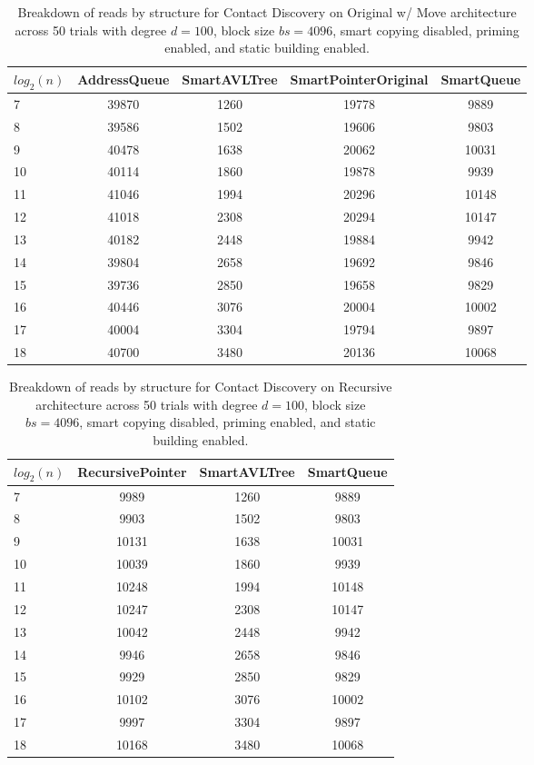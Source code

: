 \begin{table}[]
\centering
\begin{tabular}{|l|c|c|c|c|}
$log_2(n)$ & AddressQueue & SmartAVLTree & SmartPointerOriginal & SmartQueue \\ \hline
7 & 39870 & 1260 & 19778 & 9889 \\ \hline
8 & 39586 & 1502 & 19606 & 9803 \\ \hline
9 & 40478 & 1638 & 20062 & 10031 \\ \hline
10 & 40114 & 1860 & 19878 & 9939 \\ \hline
11 & 41046 & 1994 & 20296 & 10148 \\ \hline
12 & 41018 & 2308 & 20294 & 10147 \\ \hline
13 & 40182 & 2448 & 19884 & 9942 \\ \hline
14 & 39804 & 2658 & 19692 & 9846 \\ \hline
15 & 39736 & 2850 & 19658 & 9829 \\ \hline
16 & 40446 & 3076 & 20004 & 10002 \\ \hline
17 & 40004 & 3304 & 19794 & 9897 \\ \hline
18 & 40700 & 3480 & 20136 & 10068 \\ \hline
\end{tabular}
\caption{Breakdown of reads by structure for Contact Discovery on Original w/ Move architecture across 50 trials with degree $d=100$, block size $bs=4096$, smart copying disabled, priming enabled, and static building enabled.}
    \label{tab:reads_by_structure_cd_d100_bs4096_trials50_copiesfalse_primetrue_staticinsertiontrue_ptoriginal_movetrue}
\end{table}

\begin{table}[]
\centering
\begin{tabular}{|l|c|c|c|}
$log_2(n)$ & RecursivePointer & SmartAVLTree & SmartQueue \\ \hline
7 & 9989 & 1260 & 9889 \\ \hline
8 & 9903 & 1502 & 9803 \\ \hline
9 & 10131 & 1638 & 10031 \\ \hline
10 & 10039 & 1860 & 9939 \\ \hline
11 & 10248 & 1994 & 10148 \\ \hline
12 & 10247 & 2308 & 10147 \\ \hline
13 & 10042 & 2448 & 9942 \\ \hline
14 & 9946 & 2658 & 9846 \\ \hline
15 & 9929 & 2850 & 9829 \\ \hline
16 & 10102 & 3076 & 10002 \\ \hline
17 & 9997 & 3304 & 9897 \\ \hline
18 & 10168 & 3480 & 10068 \\ \hline
\end{tabular}
\caption{Breakdown of reads by structure for Contact Discovery on Recursive architecture across 50 trials with degree $d=100$, block size $bs=4096$, smart copying disabled, priming enabled, and static building enabled.}
    \label{tab:reads_by_structure_cd_d100_bs4096_trials50_copiesfalse_primetrue_staticinsertiontrue_ptrecursive_movetrue}
\end{table}

